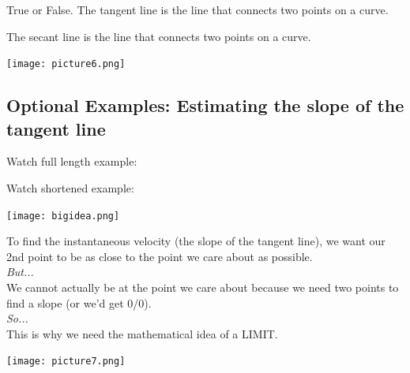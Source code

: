 \documentclass{ximera}
\begin{document}

\begin{question}
  True or False. The tangent line is the line that connects two points on a curve. 
  \begin{multipleChoice}
  \end{multipleChoice}
  \begin{feedback}
  The secant line is the line that connects two points on a curve.
  \end{feedback}
\end{question}

\begin{image}
\texttt{[image: picture6.png]}
\end{image}

\subsection{Optional Examples: Estimating the slope of the tangent line}

Watch full length example:
\begin{foldable}
\end{foldable}

Watch shortened example: 
\begin{foldable}
\end{foldable}

\begin{image}
\texttt{[image: bigidea.png]}
\end{image}
To find the instantaneous velocity (the slope of the tangent line), we want our 2nd point to be as close to the point we care about as possible. \\
\textit{But...} \\
We cannot actually be at the point we care about because we need two points to find a slope (or we'd get 0/0). \\
\textit{So...} \\
This is why we need the mathematical idea of a LIMIT.

\begin{image}
\texttt{[image: picture7.png]}
\end{image}

\end{document}
